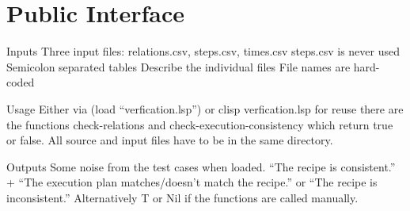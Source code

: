 \chapter{Public Interface}

  Inputs
    Three input files: relations.csv, steps.csv, times.csv
    steps.csv is never used
    Semicolon separated tables
    Describe the individual files
    File names are hard-coded
      
  Usage
    Either via (load ``verfication.lsp'') or clisp verfication.lsp
    for reuse there are the functions check-relations and
    check-execution-consistency which return true or false.
    All source and input files have to be in the same directory.
  
  Outputs
    Some noise from the test cases when loaded.
    ``The recipe is consistent.'' + ``The execution plan matches/doesn't match
    the recipe.''
    or ``The recipe is inconsistent.''
    Alternatively T or Nil if the functions are called manually.
